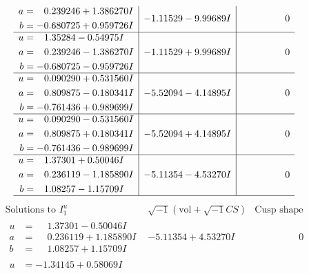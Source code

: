 \documentclass[1p]{elsarticle_modified}
\theoremstyle{definition}
\newcommand{\I}{\sqrt{-1}}
\begin{document}
$$\begin{array}{c|c|c}
\begin{aligned}
a &= \phantom{-}0.239246 + 1.386270 I \\
b &= -0.680725 + 0.959726 I\end{aligned}
 & -1.11529 - 9.99689 I & \phantom{-0.000000 } 0 \\ \hline\begin{aligned}
u &= \phantom{-}1.35284 - 0.54975 I \\
a &= \phantom{-}0.239246 - 1.386270 I \\
b &= -0.680725 - 0.959726 I\end{aligned}
 & -1.11529 + 9.99689 I & \phantom{-0.000000 } 0 \\ \hline\begin{aligned}
u &= \phantom{-}0.090290 + 0.531560 I \\
a &= \phantom{-}0.809875 - 0.180341 I \\
b &= -0.761436 + 0.989699 I\end{aligned}
 & -5.52094 - 4.14895 I & \phantom{-0.000000 } 0 \\ \hline\begin{aligned}
u &= \phantom{-}0.090290 - 0.531560 I \\
a &= \phantom{-}0.809875 + 0.180341 I \\
b &= -0.761436 - 0.989699 I\end{aligned}
 & -5.52094 + 4.14895 I & \phantom{-0.000000 } 0 \\ \hline\begin{aligned}
u &= \phantom{-}1.37301 + 0.50046 I \\
a &= \phantom{-}0.236119 - 1.185890 I \\
b &= \phantom{-}1.08257 - 1.15709 I\end{aligned}
 & -5.11354 - 4.53270 I & \phantom{-0.000000 } 0\\
 \hline 
 \end{array}$$\newpage$$\begin{array}{c|c|c}  
\text{Solutions to }I^u_{1}& \I (\text{vol} + \sqrt{-1}CS) & \text{Cusp shape}\\
 \hline 
\begin{aligned}
u &= \phantom{-}1.37301 - 0.50046 I \\
a &= \phantom{-}0.236119 + 1.185890 I \\
b &= \phantom{-}1.08257 + 1.15709 I\end{aligned}
 & -5.11354 + 4.53270 I & \phantom{-0.000000 } 0 \\ \hline\begin{aligned}
u &= -1.34145 + 0.58069 I \\

\end{aligned}
\end{array}$$
\end{document}
